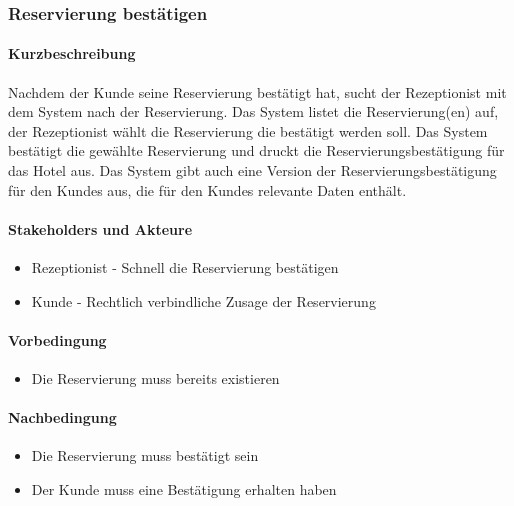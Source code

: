 \subsubsection{Reservierung bestätigen}
\label{UseCase_ReservierungBestätigen}

\paragraph{Kurzbeschreibung}
Nachdem der \Gls{Kunde} seine \Gls{Reservierung} bestätigt hat, sucht der \Gls{Rezeptionist} mit dem System nach der \Gls{Reservierung}. Das System listet die \Gls{Reservierung}(en) auf, der \Gls{Rezeptionist} wählt die \Gls{Reservierung} die bestätigt werden soll. Das System bestätigt die gewählte \Gls{Reservierung} und druckt die Reservierungsbestätigung für das Hotel aus. Das System gibt auch eine Version der Reservierungsbestätigung für den \Glspl{Kunde} aus, die für den \Glspl{Kunde} relevante Daten enthält.

\paragraph{Stakeholders und Akteure}
\begin{itemize}
	\item \Gls{Rezeptionist} - Schnell die \Gls{Reservierung} bestätigen
	\item \Gls{Kunde} - Rechtlich verbindliche Zusage der \Gls{Reservierung}
\end{itemize}

\paragraph{Vorbedingung}
\begin{itemize}
	\item Die \Gls{Reservierung} muss bereits existieren
\end{itemize}

\paragraph{Nachbedingung}
\begin{itemize}
	\item Die \Gls{Reservierung} muss bestätigt sein
	\item Der \Gls{Kunde} muss eine Bestätigung erhalten haben
\end{itemize}

